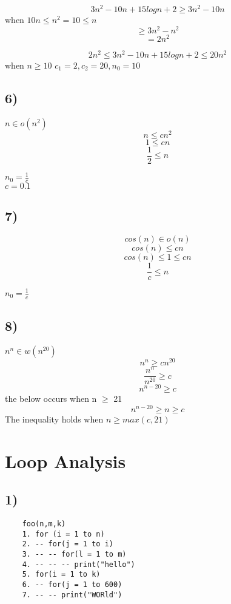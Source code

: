 \documentclass[12pt]{article}
\begin{document}
	$$3n^2 - 10n + 15logn + 2 \geq 3n^2 - 10n$$
	when $10n \leq n^2 = 10 \leq n$\\
	$$\geq 3n^2 - n^2$$
	$$= 2n^2$$
	
	$$2n^2 \leq 3n^2 - 10n + 15logn + 2 \leq 20n^2$$
	when $n \geq 10$
	$c_1 = 2, c_2 = 20, n_0 = 10$\\
	
	\subsection*{6)}
	$n \in o(n^2)$\\
	$$n \leq cn^2$$
	$$1 \leq cn$$
	$$\frac{1}{2} \leq n$$
	
	$n_0 = \frac{1}{c}$\\
	$c = 0.1$\\
	
	\subsection*{7)}
	$$cos(n) \in o(n)$$
	$$cos(n) \leq cn$$
	$$cos(n) \leq 1 \leq cn$$
	$$\frac{1}{c} \leq n$$
	
	$n_0 = \frac{1}{c}$\\
	
	\subsection*{8)}
	
	$n^n \in w (n^20)$\\
	
	$$n^n \geq cn^20$$
	$$\frac{n^n}{n^20} \geq c$$
	$$n^{n-20} \geq c$$
	the below occurs when n $\geq$ 21\\
	$$n^{n-20} \geq n \geq c$$
	The inequality holds when $n \geq max(c,21)$\\
	
	\section*{Loop Analysis}
	\subsection*{1)}
	\begin{verbatim}
	foo(n,m,k)
	1. for (i = 1 to n)
	2. -- for(j = 1 to i)
	3. -- -- for(l = 1 to m)
	4. -- -- -- print("hello")
	5. for(i = 1 to k)
	6. -- for(j = 1 to 600)
	7. -- -- print("WORld")
	\end{verbatim}
	
\end{document}
